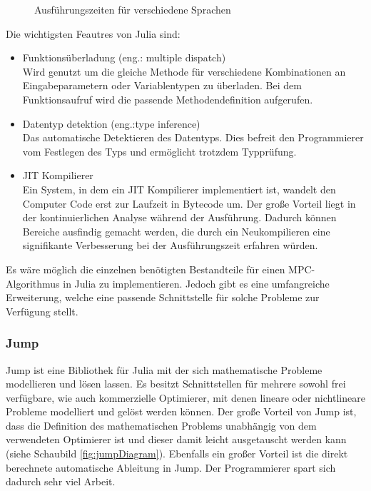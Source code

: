 \documentclass{like}
\begin{document}
\begin{figure}[ht!]
	\centering
	 
	\caption{Ausführungszeiten für verschiedene Sprachen}
	\label{fig:juliaBench}
\end{figure}

Die wichtigsten Feautres von Julia sind:

\begin{itemize}
	
	\item Funktionsüberladung (eng.: multiple dispatch)\\Wird genutzt um die gleiche Methode für verschiedene Kombinationen an Eingabeparametern oder Variablentypen zu überladen. Bei dem Funktionsaufruf wird die passende Methodendefinition aufgerufen. \\
	\item Datentyp detektion (eng.:type inference) \\Das automatische Detektieren des Datentyps. Dies befreit den Programmierer vom Festlegen des Typs und ermöglicht trotzdem Typprüfung. \\
	\item \ac{JIT} Kompilierer\\ Ein System, in dem ein \ac{JIT} Kompilierer implementiert ist, wandelt den Computer Code erst zur Laufzeit in Bytecode um. 
	Der große Vorteil liegt in der kontinuierlichen Analyse während der Ausführung. Dadurch können Bereiche ausfindig gemacht werden, die durch ein Neukompilieren eine signifikante Verbesserung bei der Ausführungszeit erfahren würden. \\
\end{itemize}
Es wäre möglich die einzelnen benötigten Bestandteile für einen \ac{MPC}-Algorithmus in Julia zu implementieren. Jedoch gibt es eine umfangreiche Erweiterung, welche eine passende Schnittstelle für solche Probleme zur Verfügung stellt.

\subsubsection*{Jump}
\ac{Jump} ist eine Bibliothek für Julia mit der sich mathematische Probleme modellieren und lösen lassen. Es besitzt Schnittstellen für mehrere sowohl frei verfügbare, wie auch kommerzielle Optimierer, mit denen lineare oder nichtlineare Probleme modelliert und gelöst werden können. Der große Vorteil von \ac{Jump} ist, dass die Definition des mathematischen Problems unabhängig von dem verwendeten Optimierer ist und dieser damit leicht ausgetauscht werden kann (siehe Schaubild \ref{fig:jumpDiagram}). Ebenfalls ein großer Vorteil ist die direkt berechnete automatische Ableitung in \ac{Jump}. Der Programmierer spart sich dadurch sehr viel Arbeit.
\end{document}
